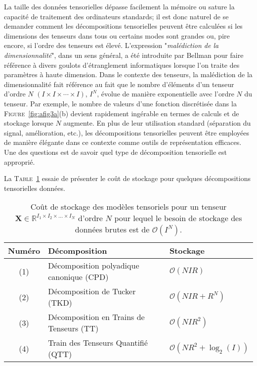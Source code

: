 \documentclass[11pt,a4paper,oneside]{book}
\def\op{\mathcal O}
\def\RItn{\mathbb{R}^{I_1 \times I_2 \times \ldots \times I_N}}
\newcommand{\mbf}[1]{\mathbf{#1}}
\newcommand{\figref}[1]{\textsc{Figure}~\ref{#1}}
\newcommand{\tabref}[1]{\textsc{Table}~\ref{#1}}
\begin{document}
La taille des données tensorielles dépasse facilement la mémoire ou sature la capacité de traitement des ordinateurs standards; il est donc naturel de se demander comment les décompositions tensorielles peuvent être calculées si les dimensions des tenseurs dans tous ou certains modes sont grandes ou, pire encore, si l'ordre des tenseurs est élevé. L'expression "\textit{malédiction de la dimensionnalité}", dans un sens général, a été introduite par Bellman pour faire référence à divers goulots d'étranglement informatiques lorsque l'on traite des paramètres à haute dimension. Dans le contexte des tenseurs, la malédiction de la dimensionnalité fait référence au fait que le nombre d'éléments d'un tenseur d'ordre $ N $ $ (I\times I\times\cdots\times I) $, $ I^{N} $, évolue de manière exponentielle avec l'ordre $ N $ du tenseur. Par exemple, le nombre de valeurs d'une fonction discrétisée dans la 
\figref{fig:afig3a}(b) devient rapidement ingérable en termes de calculs et de stockage lorsque $ N $ augmente. En plus de leur utilisation standard (séparation du signal, amélioration, etc.), les décompositions tensorielles peuvent être employées de manière élégante dans ce contexte comme outils de représentation efficaces. Une des questions est de savoir quel type de décomposition tensorielle est approprié.

La \tabref{tab:tab3.1} essaie de présenter le coût de stockage pour quelques décompositions tensorielles données.
\begin{table}[htbp]
\centering
\caption{Coût de stockage des modèles tensoriels pour un tenseur  $ \mbf{X}\in\RItn $ d'ordre $ N $ pour lequel le besoin de stockage des données brutes est de $ \op(I^{N}) $. }
\label{tab:tab3.1}
\begin{tabular}{|cll|}
	\hline\hline
	Numéro&Décomposition&Stockage\\
	\hline
	(1)&Décomposition polyadique canonique (CPD)&$ \op(NIR) $\\
	(2)&Décomposition de Tucker (TKD)&$ \op(NIR+R^{N}) $\\
(3)&Décomposition en Trains de Tenseurs (TT)&$ \op(NIR^{2}) $\\
(4)&Train des Tenseurs Quantifié (QTT)&$\op\left(NR^{2}+\log_{2}(I)\right)  $\\
\hline
\hline
\end{tabular}
\end{table}
\end{document}
